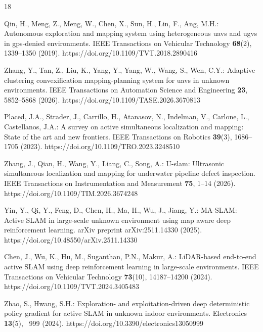 \documentclass[runningheads]{llncs}
\begin{document}
\begin{thebibliography}{18}
\fontsize{7.6}{8.6}\selectfont
\setlength{\itemsep}{0.5pt}
\providecommand{\url}[1]{\texttt{#1}}
\providecommand{\urlprefix}{URL }
\providecommand{\doi}[1]{https://doi.org/#1}

Qin, H., Meng, Z., Meng, W., Chen, X., Sun, H., Lin, F., Ang, M.H.: Autonomous
  exploration and mapping system using heterogeneous uavs and ugvs in
  gps-denied environments. IEEE Transactions on Vehicular Technology
  \textbf{68}(2),  1339--1350 (2019). \doi{10.1109/TVT.2018.2890416}

Zhang, Y., Tan, Z., Liu, K., Yang, Y., Yang, W., Wang, S., Wen, C.Y.: Adaptive
  clustering convexification mapping-planning system for uavs in unknown
  environments. IEEE Transactions on Automation Science and Engineering
  \textbf{23},  5852--5868 (2026). \doi{10.1109/TASE.2026.3670813}

Placed, J.A., Strader, J., Carrillo, H., Atanasov, N., Indelman, V., Carlone,
  L., Castellanos, J.A.: A survey on active simultaneous localization and
  mapping: State of the art and new frontiers. IEEE Transactions on Robotics
  \textbf{39}(3),  1686--1705 (2023). \doi{10.1109/TRO.2023.3248510}

Zhang, J., Qian, H., Wang, Y., Liang, C., Song, A.: U-slam: Ultrasonic
  simultaneous localization and mapping for underwater pipeline defect
  inspection. IEEE Transactions on Instrumentation and Measurement
  \textbf{75},  1--14 (2026). \doi{10.1109/TIM.2026.3674248}

Yin, Y., Qi, Y., Feng, D., Chen, H., Ma, H., Wu, J., Jiang, Y.: {MA-SLAM}:
  Active {SLAM} in large-scale unknown environment using map aware deep
  reinforcement learning. arXiv preprint arXiv:2511.14330  (2025).
  \doi{10.48550/arXiv.2511.14330}

Chen, J., Wu, K., Hu, M., Suganthan, P.N., Makur, A.: {LiDAR}-based end-to-end
  active {SLAM} using deep reinforcement learning in large-scale environments.
  IEEE Transactions on Vehicular Technology  \textbf{73}(10),  14187--14200
  (2024). \doi{10.1109/TVT.2024.3405483}

Zhao, S., Hwang, S.H.: Exploration- and exploitation-driven deep deterministic
  policy gradient for active {SLAM} in unknown indoor environments. Electronics
   \textbf{13}(5), ~999 (2024). \doi{10.3390/electronics13050999}


\end{thebibliography}
\end{document}
